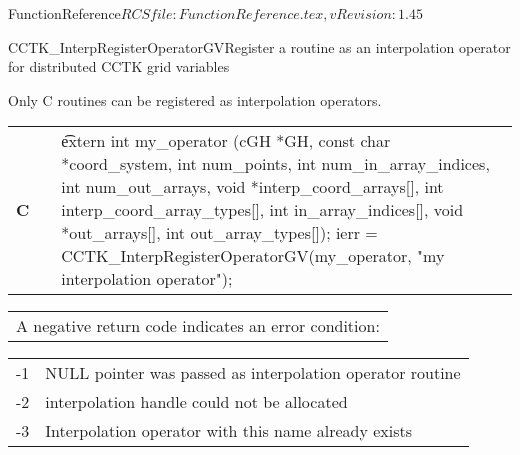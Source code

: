 \begin{cactuspart}{5}{FunctionReference}{$RCSfile: FunctionReference.tex,v $}{$Revision: 1.45 $}
\begin{CCTKFunc}{CCTK\_InterpRegisterOperatorGV}{Register a routine as an
interpolation operator for distributed CCTK grid variables}
\label{CCTK-InterpRegisterOperatorGV}
\showcargs
\begin{params}
\end{params}
\begin{discussion}
Only C routines can be registered as interpolation operators.
\end{discussion}
\begin{examples}
\begin{tabular}{@{}p{3cm}cp{11cm}}
\hfill {\bf C} && {\t
extern int my\_operator (cGH *GH,\vfill
\hspace{29ex}const char *coord\_system,\vfill
\hspace{29ex}int num\_points,\vfill
\hspace{29ex}int num\_in\_array\_indices,\vfill
\hspace{29ex}int num\_out\_arrays,\vfill
\hspace{29ex}void *interp\_coord\_arrays[],\vfill
\hspace{29ex}int interp\_coord\_array\_types[],\vfill
\hspace{29ex}int in\_array\_indices[],\vfill
\hspace{29ex}void *out\_arrays[],\vfill
\hspace{29ex}int out\_array\_types[]);\linebreak
ierr = CCTK\_InterpRegisterOperatorGV(my\_operator,\vfill
\hspace{2ex}"my interpolation operator");}
\\
\end{tabular}
\end{examples}
\begin{errorcodes}
\begin{tabular}{l}
A negative return code indicates an error condition:
\end{tabular}
\begin{tabular}{ll}
-1 & NULL pointer was passed as interpolation operator routine\\
-2 & interpolation handle could not be allocated\\
-3 & Interpolation operator with this name already exists\\
\end{tabular}
\end{errorcodes}
\end{CCTKFunc}



\end{cactuspart}
